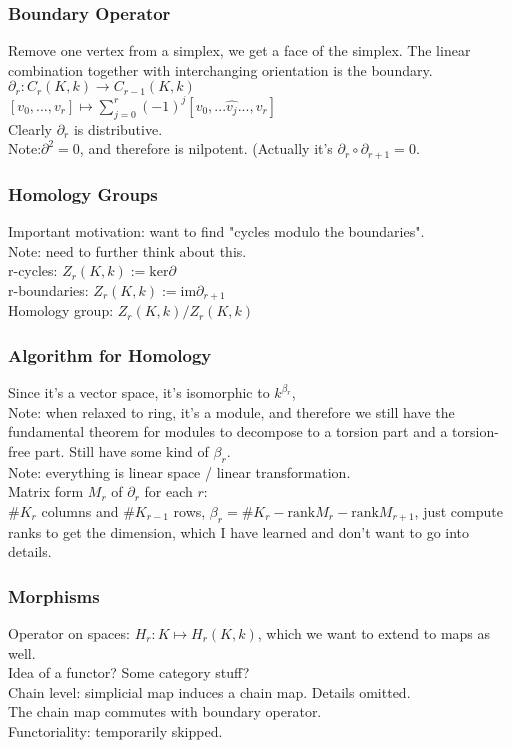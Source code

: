 \documentclass[10pt,a4paper]{article}
\begin{document}
\subsubsection{Boundary Operator}
Remove one vertex from a simplex, we get a face of the simplex. The linear combination together with interchanging orientation is the boundary.\\
$\partial_r:C_r(K,k)\to C_{r-1}(K,k)$\\
$[v_0,...,v_r]\mapsto\sum_{j=0}^{r}(-1)^{j}[v_0,...\hat{v_j}...,v_r]$\\
Clearly $\partial_r$ is distributive.\\
Note:$\partial^2=0$, and therefore is nilpotent. (Actually it's $\partial_r\circ\partial_{r+1}=0$.
\subsubsection{Homology Groups}
Important motivation: want to find "cycles modulo the boundaries".\\
Note: need to further think about this.\\
r-cycles: $Z_r(K,k):=\text{ker}\partial$\\
r-boundaries: $Z_r(K,k):=\text{im}\partial_{r+1}$\\
Homology group: $Z_r(K,k)/Z_r(K,k)$
\subsubsection{Algorithm for Homology}
Since it's a vector space, it's isomorphic to $k^{\beta_r}$,\\
Note: when relaxed to ring, it's a module, and therefore we still have the fundamental theorem for modules to decompose to a torsion part and a torsion-free part. Still have some kind of $\beta_r$.\\
Note: everything is linear space / linear transformation.\\
Matrix form $M_r$ of $\partial_r$ for each $r$:\\
$\#K_r$ columns and $\#K_{r-1}$ rows, $\beta_r=\#K_r-\text{rank}M_r-\text{rank}M_{r+1}$, just compute ranks to get the dimension, which I have learned and don't want to go into details.
\subsubsection{Morphisms}
Operator on spaces: $H_r:K\mapsto H_r(K,k)$, which we want to extend to maps as well.\\
Idea of a functor? Some category stuff?\\
Chain level: simplicial map induces a chain map. Details omitted.\\
The chain map commutes with boundary operator.\\
Functoriality: temporarily skipped.
\end{document}
